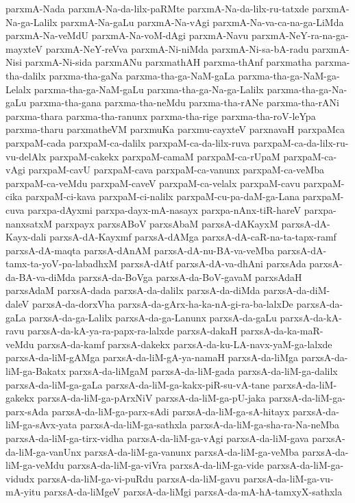 {parxmA-Nada
parxmA-Na-da-lilx-paRMte
parxmA-Na-da-lilx-ru-tatxde
parxmA-Na-ga-Lalilx
parxmA-Na-gaLu
parxmA-Na-vAgi
parxmA-Na-va-ca-na-ga-LiMda
parxmA-Na-veMdU
parxmA-Na-voM-dAgi
parxmA-Navu
parxmA-NeY-ra-na-ga-mayxteV
parxmA-NeY-reVva
parxmA-Ni-niMda
parxmA-Ni-sa-bA-radu
parxmA-Nisi
parxmA-Ni-sida
parxmANu
parxmathAH
parxma-thAnf
parxmatha
parxma-tha-dalilx
parxma-tha-gaNa
parxma-tha-ga-NaM-gaLa
parxma-tha-ga-NaM-ga-Lelalx
parxma-tha-ga-NaM-gaLu
parxma-tha-ga-Na-ga-Lalilx
parxma-tha-ga-Na-gaLu
parxma-tha-gana
parxma-tha-neMdu
parxma-tha-rANe
parxma-tha-rANi
parxma-thara
parxma-tha-ranunx
parxma-tha-rige
parxma-tha-roV-leYpa
parxma-tharu
parxmatheVM
parxmuKa
parxmu-cayxteV
parxnavaH
parxpaMca
parxpaM-cada
parxpaM-ca-dalilx
parxpaM-ca-da-lilx-ruva
parxpaM-ca-da-lilx-ru-vu-delAlx
parxpaM-cakekx
parxpaM-camaM
parxpaM-ca-rUpaM
parxpaM-ca-vAgi
parxpaM-cavU
parxpaM-cava
parxpaM-ca-vanunx
parxpaM-ca-veMba
parxpaM-ca-veMdu
parxpaM-caveV
parxpaM-ca-velalx
parxpaM-cavu
parxpaM-cika
parxpaM-ci-kava
parxpaM-ci-nalilx
parxpaM-cu-pa-daM-ga-Lana
parxpaM-cuva
parxpa-dAyxmi
parxpa-dayx-mA-nasayx
parxpa-nAnx-tiR-hareV
parxpa-nanxsatxM
parxpayx
parxsABoV
parxsAbaM
parxsA-dAKayxM
parxsA-dA-Kayx-dali
parxsA-dA-Kayxmf
parxsA-dAMga
parxsA-dA-caR-na-ta-tapx-ramf
parxsA-dA-maqta
parxsA-dAnAM
parxsA-dA-nu-BA-va-veMba
parxsA-dA-tamx-ta-yoV-pa-labadhxM
parxsA-dAtf
parxsA-dA-va-dhAni
parxsAda
parxsA-da-BA-va-diMda
parxsA-da-BoVga
parxsA-da-BoV-gavaM
parxsAdaH
parxsAdaM
parxsA-dada
parxsA-da-dalilx
parxsA-da-diMda
parxsA-da-diM-daleV
parxsA-da-dorxVha
parxsA-da-gArx-ha-ka-nA-gi-ra-ba-lalxDe
parxsA-da-gaLa
parxsA-da-ga-Lalilx
parxsA-da-ga-Lanunx
parxsA-da-gaLu
parxsA-da-kA-ravu
parxsA-da-kA-ya-ra-papx-ra-lalxde
parxsA-dakaH
parxsA-da-ka-maR-veMdu
parxsA-da-kamf
parxsA-dakekx
parxsA-da-ku-LA-navx-yaM-ga-lalxde
parxsA-da-liM-gAMga
parxsA-da-liM-gA-ya-namaH
parxsA-da-liMga
parxsA-da-liM-ga-Bakatx
parxsA-da-liMgaM
parxsA-da-liM-gada
parxsA-da-liM-ga-dalilx
parxsA-da-liM-ga-gaLa
parxsA-da-liM-ga-kakx-piR-su-vA-tane
parxsA-da-liM-gakekx
parxsA-da-liM-ga-pArxNiV
parxsA-da-liM-ga-pU-jaka
parxsA-da-liM-ga-parx-sAda
parxsA-da-liM-ga-parx-sAdi
parxsA-da-liM-ga-sA-hitayx
parxsA-da-liM-ga-sAvx-yata
parxsA-da-liM-ga-sathxla
parxsA-da-liM-ga-sha-ra-Na-neMba
parxsA-da-liM-ga-tirx-vidha
parxsA-da-liM-ga-vAgi
parxsA-da-liM-gava
parxsA-da-liM-ga-vanUnx
parxsA-da-liM-ga-vanunx
parxsA-da-liM-ga-veMba
parxsA-da-liM-ga-veMdu
parxsA-da-liM-ga-viVra
parxsA-da-liM-ga-vide
parxsA-da-liM-ga-vidudx
parxsA-da-liM-ga-vi-puRdu
parxsA-da-liM-gavu
parxsA-da-liM-ga-vu-mA-yitu
parxsA-da-liMgeV
parxsA-da-liMgi
parxsA-da-mA-hA-tamxyX-sathxla
}
